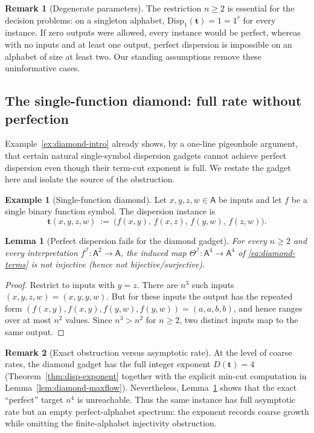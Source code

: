 \documentclass[11pt]{article}
\theoremstyle{definition}
\newtheorem{remark}{Remark}[section]
\newtheorem{example}{Example}[section]
\theoremstyle{plain}
\newtheorem{lemma}[definition]{Lemma}
\newcommand{\A}{\mathsf{A}}
\newcommand{\Disp}{\mathrm{Disp}}
\begin{document}
\begin{remark}[Degenerate parameters]
The restriction $n\ge 2$ is essential for the decision problems: on a singleton alphabet,
$\Disp_1(\mathbf t)=1=1^r$ for every instance.  If zero outputs were allowed, every instance would be
perfect, whereas with no inputs and at least one output, perfect dispersion is impossible on an alphabet of
size at least two.  Our standing assumptions remove these uninformative cases.
\end{remark}

\subsection{The single-function diamond: full rate without perfection}
\label{sec:diamond}
Example~\ref{ex:diamond-intro} already shows, by a one-line pigeonhole argument, that certain natural
single-symbol dispersion gadgets cannot achieve perfect dispersion even though their term-cut exponent is full.
We restate the gadget here and isolate the source of the obstruction.

\begin{example}[Single-function diamond]
\label{ex:diamond}
Let $x,y,z,w\in\A$ be inputs and let $f$ be a single binary function symbol.
The dispersion instance is
\begin{equation}
\label{eq:diamond-terms}
\mathbf t(x,y,z,w)\ :=\ \bigl( f(x,y),\, f(x,z),\, f(y,w),\, f(z,w)\bigr).
\end{equation}
\end{example}

\begin{lemma}[Perfect dispersion fails for the diamond gadget]
\label{lem:diamond-not-bij}
For every $n\ge 2$ and every interpretation $f^\mathcal I:\A^2\to\A$, the induced map
$\Theta^\mathcal I:\A^4\to\A^4$ of \eqref{eq:diamond-terms} is not injective (hence not bijective/surjective).
\end{lemma}

\begin{proof}
Restrict to inputs with $y=z$.
There are $n^3$ such inputs $(x,y,z,w)=(x,y,y,w)$.
But for these inputs the output has the repeated form
$(f(x,y),f(x,y),f(y,w),f(y,w))=(a,a,b,b)$, and hence ranges over at most $n^2$ values.
Since $n^3>n^2$ for $n\ge 2$, two distinct inputs map to the same output.
\end{proof}

\begin{remark}[Exact obstruction versus asymptotic rate]
At the level of coarse rates, the diamond gadget has the full integer exponent $D(\mathbf t)=4$
(Theorem~\ref{thm:disp-exponent} together with the explicit min-cut computation in Lemma~\ref{lem:diamond-maxflow}).
Nevertheless, Lemma~\ref{lem:diamond-not-bij} shows that the exact ``perfect'' target $n^4$ is unreachable.
Thus the same instance has full asymptotic rate but an empty perfect-alphabet spectrum: the exponent records
coarse growth while omitting the finite-alphabet injectivity obstruction.
\end{remark}
\end{document}
